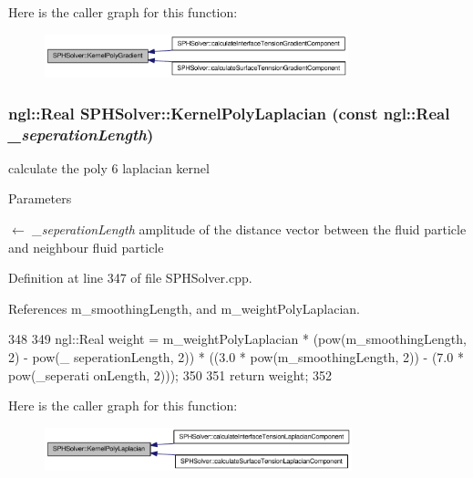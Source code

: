 Here is the caller graph for this function:\nopagebreak
\begin{figure}[H]
\begin{center}
\leavevmode
\includegraphics[width=250pt]{class_s_p_h_solver_a2431a032b4972d7e684642e4d8c9e058_icgraph}
\end{center}
\end{figure}


\hypertarget{class_s_p_h_solver_ae0189c4c0301b0bb25d792b3b7ab08f5}{
\subsubsection[{KernelPolyLaplacian}]{\setlength{\rightskip}{0pt plus 5cm}ngl::Real SPHSolver::KernelPolyLaplacian (const ngl::Real {\em \_\-seperationLength})}}
\label{class_s_p_h_solver_ae0189c4c0301b0bb25d792b3b7ab08f5}


calculate the poly 6 laplacian kernel 


\begin{DoxyParams}{Parameters}
\item[\mbox{$\leftarrow$} {\em \_\-seperationLength}]amplitude of the distance vector between the fluid particle and neighbour fluid particle \end{DoxyParams}


Definition at line 347 of file SPHSolver.cpp.



References m\_\-smoothingLength, and m\_\-weightPolyLaplacian.




\begin{DoxyCode}
348 {
349     ngl::Real weight = m_weightPolyLaplacian * (pow(m_smoothingLength, 2) - pow(_
      seperationLength, 2)) * ((3.0 * pow(m_smoothingLength, 2)) - (7.0 * pow(_seperati
      onLength, 2)));
350 
351     return weight;
352 }
\end{DoxyCode}




Here is the caller graph for this function:\nopagebreak
\begin{figure}[H]
\begin{center}
\leavevmode
\includegraphics[width=253pt]{class_s_p_h_solver_ae0189c4c0301b0bb25d792b3b7ab08f5_icgraph}
\end{center}
\end{figure}


